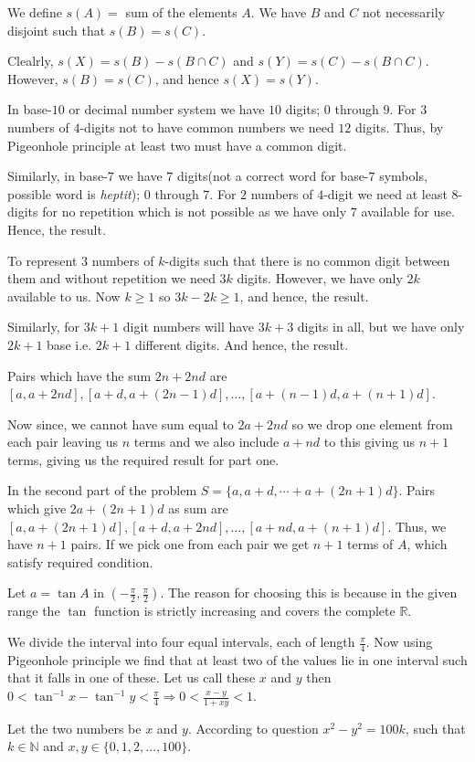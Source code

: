   We define $s(A) =$ sum of the elements $A$. We have $B$ and $C$ not necessarily disjoint such that $s(B) =
  s(C)$.

  Clealrly, $s(X) = s(B) - s(B\cap C)$ and $s(Y) = s(C) - s(B\cap C)$. However, $s(B) = s(C)$, and hence
  $s(X) = s(Y)$.
\item In base-$10$ or decimal number system we have $10$ digits; $0$ through $9$. For $3$ numbers of
  $4$-digits not to have common numbers we need $12$ digits. Thus, by Pigeonhole principle at least two must
  have a common digit.

  Similarly, in base-$7$ we have $7$ digits(not a correct word for base-$7$ symbols, possible word is {\it
    heptit}); $0$ through $7$. For $2$ numbers of $4$-digit we need at least $8$-digits for no repetition
  which is not possible as we have only $7$ available for use. Hence, the result.
\item To represent $3$ numbers of $k$-digits such that there is no common digit between them and without
  repetition we need $3k$ digits. However, we have only $2k$ available to us. Now $k\geq 1$ so $3k - 2k\geq
  1$, and hence, the result.

  Similarly, for $3k + 1$ digit numbers will have $3k + 3$ digits in all, but we have only $2k + 1$ base
  i.e. $2k + 1$ different digits. And hence, the result.
\item Pairs which have the sum $2n + 2nd$ are $[a, a + 2nd], [a + d, a + (2n - 1)d], \ldots, [a + (n - 1)d,
  a + (n + 1)d]$.

  Now since, we cannot have sum equal to $2a + 2nd$ so we drop one element from each pair leaving us $n$
  terms and we also include $a + nd$ to this giving us $n + 1$ terms, giving us the required result for part
  one.

  In the second part of the problem $S = \{a, a + d, \cdots + a + (2n + 1)d\}$. Pairs which give $2a + (2n +
  1)d$ as sum are $[a, a + (2n + 1)d], [a + d, a + 2nd], \ldots, [a + nd, a + (n + 1)d]$. Thus, we have $n +
  1$ pairs. If we pick one from each pair we get $n + 1$ terms of $A$, which satisfy required condition.
\item Let $a = \tan A$ in $\left(-\frac{\pi}{2}, \frac{\pi}{2}\right)$. The reason for choosing this is
  because in the given range the $\tan$ function is strictly increasing and covers the complete
  $\mathbb{R}$.

  We divide the interval into four equal intervals, each of length $\frac{\pi}{4}$. Now using Pigeonhole
  principle we find that at least two of the values lie in one interval such that it falls in one of
  these. Let us call these $x$ and $y$ then $0 < \tan^{-1}x - \tan^{-1}y < \frac{\pi}{4}\Rightarrow 0 <
  \frac{x - y}{1 + xy} < 1$.
\item Let the two numbers be $x$ and $y$. According to question $x^2 - y^2 = 100k$, such that
  $k\in\mathbb{N}$ and $x, y \in\{0, 1, 2, \ldots, 100\}$.

